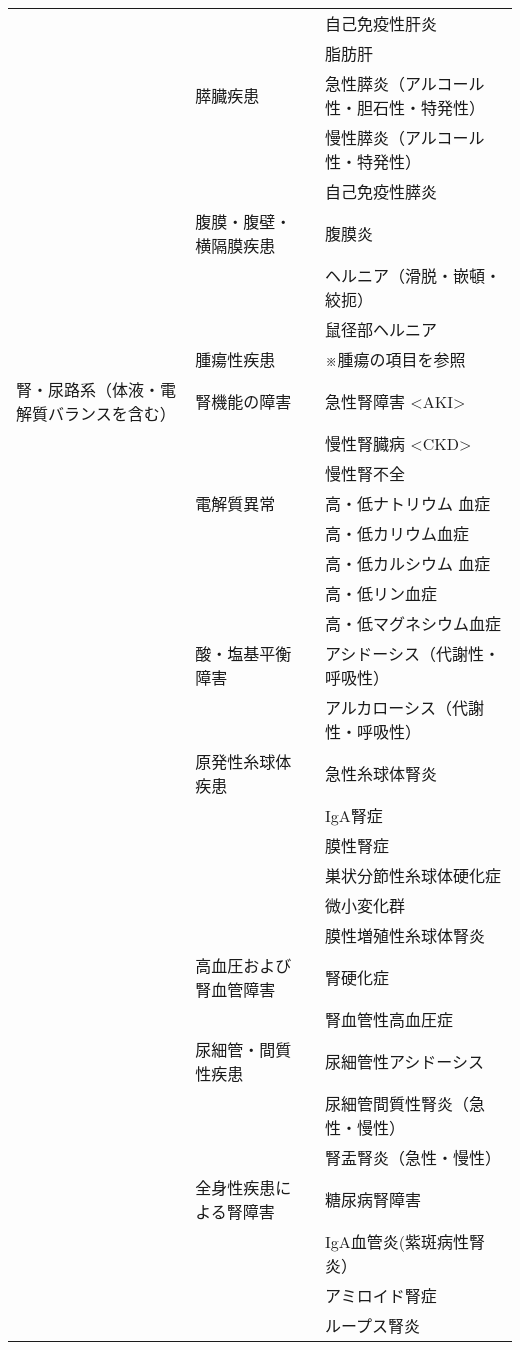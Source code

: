 \begin{xltabular}{\linewidth}{XXXX}
 &  &  & 自己免疫性肝炎 \\
 &  &  & 脂肪肝 \\
 & 膵臓疾患 &  & 急性膵炎（アルコール性・胆石性・特発性） \\
 &  &  & 慢性膵炎（アルコール性・特発性） \\
 &  &  & 自己免疫性膵炎 \\
 & 腹膜・腹壁・横隔膜疾患 &  & 腹膜炎 \\
 &  &  & ヘルニア（滑脱・嵌頓・絞扼） \\
 &  &  & 鼠径部ヘルニア \\
 & 腫瘍性疾患 &  & ※腫瘍の項目を参照 \\
腎・尿路系（体液・電解質バランスを含む） & 腎機能の障害 &  & 急性腎障害 <AKI> \\
 &  &  & 慢性腎臓病 <CKD> \\
 &  &  & 慢性腎不全 \\
 & 電解質異常 &  & 高・低ナトリウム 血症 \\
 &  &  & 高・低カリウム血症 \\
 &  &  & 高・低カルシウム 血症 \\
 &  &  & 高・低リン血症 \\
 &  &  & 高・低マグネシウム血症 \\
 & 酸・塩基平衡障害 &  & アシドーシス（代謝性・呼吸性） \\
 &  &  & アルカローシス（代謝性・呼吸性） \\
 & 原発性糸球体疾患 &  & 急性糸球体腎炎 \\
 &  &  & IgA腎症 \\
 &  &  & 膜性腎症 \\
 &  &  & 巣状分節性糸球体硬化症 \\
 &  &  & 微小変化群 \\
 &  &  & 膜性増殖性糸球体腎炎 \\
 & 高血圧および腎血管障害 &  & 腎硬化症 \\
 &  &  & 腎血管性高血圧症 \\
 & 尿細管・間質性疾患 &  & 尿細管性アシドーシス \\
 &  &  & 尿細管間質性腎炎（急性・慢性） \\
 &  &  & 腎盂腎炎（急性・慢性） \\
 & 全身性疾患による腎障害 &  & 糖尿病腎障害 \\
 &  &  & IgA血管炎(紫斑病性腎炎） \\
 &  &  & アミロイド腎症 \\
 &  &  & ループス腎炎 \\

\end{xltabular}

